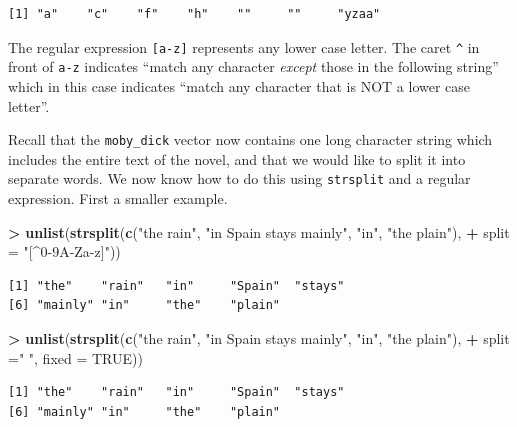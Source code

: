 \documentclass[]{krantz}
\makeatletter
\newenvironment{Shaded}{\begin{snugshade}}{\end{snugshade}}
\newcommand{\KeywordTok}[1]{\textcolor[rgb]{0.27,0.27,0.27}{\textbf{#1}}}
\newcommand{\DataTypeTok}[1]{\textcolor[rgb]{0.27,0.27,0.27}{#1}}
\newcommand{\StringTok}[1]{\textcolor[rgb]{0.5,0.5,0.5}{#1}}
\newcommand{\OtherTok}[1]{\textcolor[rgb]{0.37,0.37,0.37}{#1}}
\newcommand{\OperatorTok}[1]{\textcolor[rgb]{0.43,0.43,0.43}{\textbf{#1}}}
\newcommand{\NormalTok}[1]{#1}
\newenvironment{kframe}{%
\medskip{}
\setlength{\fboxsep}{.8em}
 \def\at@end@of@kframe{}%
 \ifinner\ifhmode%
  \def\at@end@of@kframe{\end{minipage}}%
  \begin{minipage}{\columnwidth}%
 \fi\fi%
 \def\FrameCommand##1{\hskip\@totalleftmargin \hskip-\fboxsep
 \colorbox{shadecolor}{##1}\hskip-\fboxsep
     \hskip-\linewidth \hskip-\@totalleftmargin \hskip\columnwidth}%
 \MakeFramed {\advance\hsize-\width
   \@totalleftmargin\z@ \linewidth\hsize
   \@setminipage}}%
 {\par\unskip\endMakeFramed%
 \at@end@of@kframe}
\renewenvironment{Shaded}{\begin{kframe}}{\end{kframe}}
\makeatother
\begin{document}
\begin{verbatim}
[1] "a"    "c"    "f"    "h"    ""     ""     "yzaa"
\end{verbatim}

The regular expression \texttt{{[}a-z{]}} represents any lower case
letter. The caret \texttt{\^{}} in front of \texttt{a-z} indicates
``match any character \emph{except} those in the following string''
which in this case indicates ``match any character that is NOT a lower
case letter''.

Recall that the \texttt{moby\_dick} vector now contains one long
character string which includes the entire text of the novel, and that
we would like to split it into separate words. We now know how to do
this using \texttt{strsplit} and a regular expression. First a smaller
example.

\begin{Shaded}
\begin{Highlighting}[]
\OperatorTok{>}\StringTok{ }\KeywordTok{unlist}\NormalTok{(}\KeywordTok{strsplit}\NormalTok{(}\KeywordTok{c}\NormalTok{(}\StringTok{"the rain"}\NormalTok{, }\StringTok{"in Spain stays mainly"}\NormalTok{, }\StringTok{"in"}\NormalTok{, }\StringTok{"the plain"}\NormalTok{), }
\OperatorTok{+}\StringTok{                 }\DataTypeTok{split =} \StringTok{"[^0-9A-Za-z]"}\NormalTok{))}
\end{Highlighting}
\end{Shaded}

\begin{verbatim}
[1] "the"    "rain"   "in"     "Spain"  "stays" 
[6] "mainly" "in"     "the"    "plain" 
\end{verbatim}

\begin{Shaded}
\begin{Highlighting}[]
\OperatorTok{>}\StringTok{ }\KeywordTok{unlist}\NormalTok{(}\KeywordTok{strsplit}\NormalTok{(}\KeywordTok{c}\NormalTok{(}\StringTok{"the rain"}\NormalTok{, }\StringTok{"in Spain stays mainly"}\NormalTok{, }\StringTok{"in"}\NormalTok{, }\StringTok{"the plain"}\NormalTok{), }
\OperatorTok{+}\StringTok{                 }\DataTypeTok{split =}\StringTok{" "}\NormalTok{, }\DataTypeTok{fixed =} \OtherTok{TRUE}\NormalTok{))}
\end{Highlighting}
\end{Shaded}

\begin{verbatim}
[1] "the"    "rain"   "in"     "Spain"  "stays" 
[6] "mainly" "in"     "the"    "plain" 
\end{verbatim}
\end{document}
